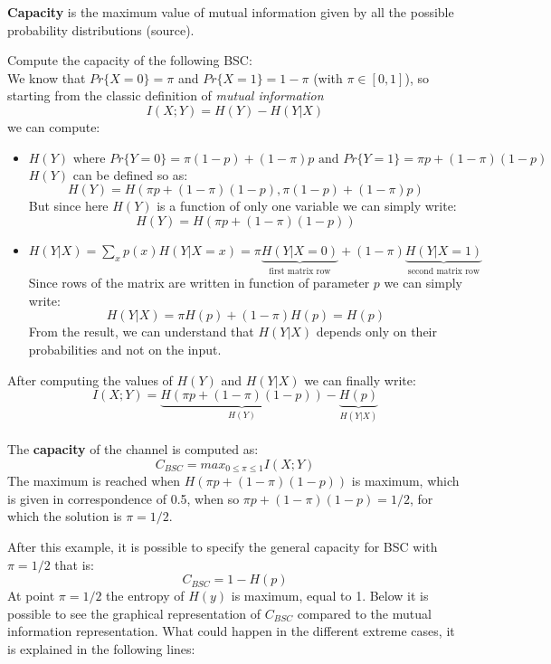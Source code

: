\textbf{Capacity} is the maximum value of mutual information given by all the possible probability distributions (source). 
\begin{exmp}
	Compute the capacity of the following BSC:\\
	We know that $Pr\{X=0\} = \pi$ and $Pr\{X=1\} = 1-\pi$ (with $\pi \in [0,1]$), so starting from the classic definition of \textit{mutual information} $$I(X;Y) = H(Y)-H(Y|X)$$ we can compute:
	\begin{itemize}
		\item $H(Y) \text{ where } Pr\{Y=0\} = \pi(1-p) + (1-\pi)p \text{ and } Pr\{Y=1\} = \pi p + (1-\pi)(1-p)$\\
		$H(Y)$ can be defined so as:
		$$H(Y) = H(\pi p + (1-\pi)(1-p),\pi(1-p) + (1-\pi)p )$$
		But since here $H(Y)$ is a function of only one variable we can simply write:
		$$H(Y) = H(\pi p + (1-\pi)(1-p))$$
		
		\item $H(Y|X) = \sum_x p(x) H(Y|X=x) = \pi \underbrace{H(Y|X=0)}_{\text{first matrix row}} + (1-\pi)\underbrace{H(Y|X=1)}_{\text{second matrix row}}$\\
		
		Since rows of the matrix are written in function of parameter $p$ we can simply write:
		$$H(Y|X) = \pi H(p) + (1-\pi) H(p) = H(p)$$
		From the result, we can understand that $H(Y|X)$ depends only on their probabilities and not on the input.
	\end{itemize}
	After computing the values of $H(Y)$ and $H(Y|X)$ we can finally write:
	$$I(X;Y) = \underbrace{H(\pi p + (1-\pi)(1-p))}_{H(Y)} - \underbrace{H(p)}_{H(Y|X)}$$\\
	The \textbf{capacity} of the channel is computed as:
	$$C_{BSC} = max_{0 \leq \pi \leq 1} I(X;Y)$$
	The maximum is reached when $H(\pi p + (1-\pi)(1-p))$ is maximum, which is given in correspondence of 0.5, when so $\pi p + (1-\pi)(1-p) = 1/2$, for which the solution is $\pi = 1/2$. 
\end{exmp}
After this example, it is possible to specify the general capacity for BSC with $\pi = 1/2$ that is:
$$C_{BSC} = 1-H(p)$$
At point $\pi = 1/2$ the entropy of $H(y)$ is maximum, equal to 1. 
Below it is possible to see the graphical representation of $C_{BSC}$ compared to the mutual information representation.
What could happen in the different extreme cases, it is explained in the following lines:
